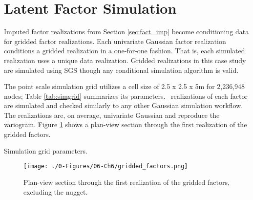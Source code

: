 \FloatBarrier
\section{Latent Factor Simulation}
\label{sec:fact_sim}

Imputed factor realizations from Section \ref{sec:fact_imp} become conditioning data for gridded factor realizations. Each univariate Gaussian factor realization conditions a gridded realization in a one-for-one fashion. That is, each simulated realization uses a unique data realization. Gridded realizations in this case study are simulated using \gls{SGS} though any conditional simulation algorithm is valid.

The point scale simulation grid utilizes a cell size of 2.5 x 2.5 x 5m for 2,236,948 nodes; Table \ref{tab:simgrid} summarizes its parameters. \csnreals \ realizations of each factor are simulated and checked similarly to any other Gaussian simulation workflow. The realizations are, on average, univariate Gaussian and reproduce the variogram. Figure \ref{fig:gridded_factors} shows a plan-view section through the first realization of the gridded factors.

\begin{table}[!htb]
    \centering
    \caption{Simulation grid parameters.}
    \resizebox{0.9\width}{!}{}
    \label{tab:simgrid}
\end{table}

\begin{figure}[htb!]
    \centering
    \texttt{[image: ./0-Figures/06-Ch6/gridded\_factors.png]}
    \caption{Plan-view section through the first realization of the gridded factors, excluding the nugget.}
    \label{fig:gridded_factors}
\end{figure}

